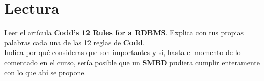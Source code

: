 \documentclass{article}
\begin{document}
    \section{Lectura}
    Leer el artícula \textbf{Codd's 12 Rules for a RDBMS}. Explica con tus 
    propias palabras cada una de las 12 reglas de \textbf{Codd}.\\
    Indica por qué consideras que son importantes y si, hasta el momento de lo 
    comentado en el curso, sería posible que un \textbf{SMBD} pudiera cumplir 
    enteramente con lo que ahí se propone.
\end{document}
